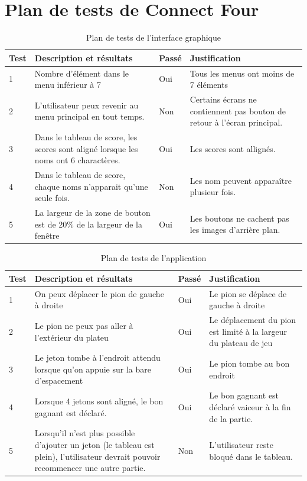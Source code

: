 \section{Plan de tests de Connect Four}

\begin{table}[H]
    \centering
    \caption{Plan de tests de l'interface graphique}
    \begin{tabular}{p{0.25in}p{2.5in}p{0.5in}p{2.5in}}
        \hline
        \bfseries Test & \bfseries Description et résultats & \bfseries Passé & \bfseries Justification \\
        \hline\hline
        1 & Nombre d'élément dans le menu inférieur à 7 & Oui & Tous les menus ont moins de 7 éléments \\
        2 & L'utilisateur peux revenir au menu principal en tout temps. & Non & Certains écrans ne contiennent pas bouton de retour à l'écran principal.\\
        3 & Dans le tableau de score, les scores sont aligné lorsque les noms ont 6 charactères. & Oui & Les scores sont allignés.\\
        4 & Dans le tableau de score, chaque noms n'apparait qu'une seule fois. & Non & Les nom peuvent apparaître plusieur fois.\\
        5 & La largeur de la zone de bouton est de 20\% de la largeur de la fenêtre & Oui & Les boutons ne cachent pas les images d'arrière plan.\\
        \hline
    \end{tabular}
\end{table}

\begin{table}[H]
    \centering
    \caption{Plan de tests de l'application}
    \begin{tabular}{p{0.25in}p{2.5in}p{0.5in}p{2.5in}}
        \hline
        \bfseries Test & \bfseries Description et résultats & \bfseries Passé & \bfseries Justification \\
        \hline\hline
        1 & On peux déplacer le pion de gauche à droite & Oui & Le pion se déplace de gauche à droite \\
        2 & Le pion ne peux pas aller à l'extérieur du plateu & Oui & Le déplacement du pion est limité à la largeur du plateau de jeu \\
        3 & Le jeton tombe à l'endroit attendu lorsque qu'on appuie sur la bare d'espacement & Oui & Le pion tombe au bon endroit \\
        4 & Lorsque 4 jetons sont aligné, le bon gagnant est déclaré. & Oui & Le bon gagnant est déclaré vaiceur à la fin de la partie.\\
        5 & Lorsqu'il n'est plus possible d'ajouter un jeton (le tableau est plein), l'utilisateur devrait pouvoir recommencer une autre partie.& Non & L'utilisateur reste bloqué dans le tableau.\\
        \hline
    \end{tabular}
\end{table}
